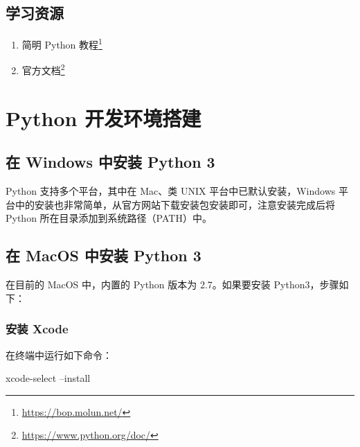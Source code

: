 \documentclass[]{ctexbook}
\newenvironment{Shaded}{\begin{snugshade}}{\end{snugshade}}
\newcommand{\ExtensionTok}[1]{#1}
\newcommand{\NormalTok}[1]{#1}
\providecommand{\tightlist}{%
  \setlength{\itemsep}{0pt}\setlength{\parskip}{0pt}}
\renewcommand{\href}[2]{#2\footnote{\url{#1}}}
\begin{document}
\hypertarget{ux5b66ux4e60ux8d44ux6e90}{%
\section{学习资源}\label{ux5b66ux4e60ux8d44ux6e90}}

\begin{enumerate}
\def\labelenumi{\arabic{enumi}.}
\tightlist
\item
  \href{https://bop.molun.net/}{简明 Python 教程}
\item
  \href{https://www.python.org/doc/}{官方文档}
\end{enumerate}

\hypertarget{ide}{%
\chapter{Python 开发环境搭建}\label{ide}}

\hypertarget{ux5728-windows-ux4e2dux5b89ux88c5-python-3}{%
\section{在 Windows 中安装 Python 3}\label{ux5728-windows-ux4e2dux5b89ux88c5-python-3}}

Python 支持多个平台，其中在 Mac、类 UNIX 平台中已默认安装，Windows 平台中的安装也非常简单，从官方网站下载安装包安装即可，注意安装完成后将 Python 所在目录添加到系统路径（PATH）中。

\hypertarget{ux5728-macos-ux4e2dux5b89ux88c5-python-3}{%
\section{在 MacOS 中安装 Python 3}\label{ux5728-macos-ux4e2dux5b89ux88c5-python-3}}

在目前的 MacOS 中，内置的 Python 版本为 2.7。如果要安装 Python3，步骤如下：

\hypertarget{ux5b89ux88c5-xcode}{%
\subsection{安装 Xcode}\label{ux5b89ux88c5-xcode}}

在终端中运行如下命令：

\begin{Shaded}
\begin{Highlighting}[]
\ExtensionTok{xcode-select}\NormalTok{ --install}
\end{Highlighting}
\end{Shaded}
\end{document}
